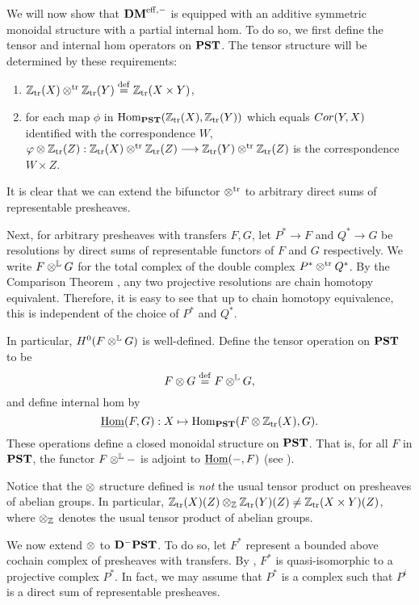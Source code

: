We will now show that $\DMeff$ is equipped with an additive 
symmetric monoidal structure with a partial internal hom. To do 
so, we first define the tensor and internal hom operators on 
$\PST$. The tensor structure will be determined by these
requirements: 

\begin{enumerate}
\item $\Ztr(X) \ttr \Ztr(Y) \defeq \Ztr(X \times Y)$, 

\item for each map $\phi$ in $\hom_{\PST}(\Ztr(X), \Ztr(Y))$ which
equals $\Cor(Y, X)$ identified with the correspondence $W$, $\phi 
\tensor \Ztr(Z): \Ztr(X) \ttr \Ztr(Z) \to \Ztr(Y) \ttr \Ztr(Z)$ is 
the correspondence $W \times Z$. 
\end{enumerate}
\noindent It is clear that we can extend the bifunctor $\ttr$ to 
arbitrary direct sums of representable presheaves.  

Next, for arbitrary presheaves with transfers $F, G$, let $P^* \to 
F$ and $Q^* \to G$ be resolutions by direct sums of representable 
functors of $F$ and $G$ respectively. We write $F \tL G$ for the 
total complex of the double complex $P^* \ttr Q^*$. By the 
Comparison Theorem \cite[2.26]{WH}, any two projective resolutions 
are chain homotopy equivalent. Therefore, it is easy to see that 
up to chain homotopy equivalence, this is independent of the 
choice of $P^*$ and $Q^*$.

In particular, $H^0(F \tL G)$ is well-defined. Define the tensor 
operation on $\PST$ to be
\[
F \tensor G \defeq F \tL G,
\]
and define internal hom by
\[
\ihom(F, G): X \mapsto \hom_{\PST}(F \tensor \Ztr(X), G).
\]
These operations define a closed monoidal structure on $\PST$.
That is, for all $F$ in $\PST$, the functor $F \tL -$ is adjoint to 
$\ihom(-, F)$ (see \cite[8.3]{MVW}).

\begin{rmk}
Notice that the $\tensor$ structure defined is \emph{not} the
usual tensor product on presheaves of abelian groups. In 
particular, $\Ztr(X)(Z) \tensor_{\Z} \Ztr(Y)(Z) \neq 
\Ztr(X \times Y)(Z)$, where $\tensor_{\Z}$ denotes the usual 
tensor product of abelian groups.
\end{rmk}

We now extend $\tensor$ to $\DCat[D]^-\PST$. To do so, let $F^*$ 
represent a bounded above cochain complex of presheaves with 
transfers. By \cite[10.5.6]{WH}, $F^*$ is quasi-isomorphic to a 
projective complex $P^*$. In fact, we may assume that $P^*$ is a 
complex such that $P^i$ is a direct sum of representable 
presheaves. 

